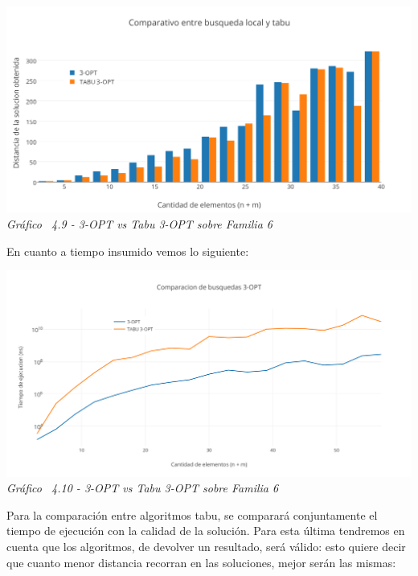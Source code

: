 \vspace*{0.3cm} \vspace*{0.3cm}
  \begin{center}
 \includegraphics[scale=0.5]{./EJ4/comparativogym03opt.png}\\
 {            \textit{Gráfico \ 4.9 - 3-OPT vs Tabu 3-OPT sobre Familia 6}}
  \end{center}
  \vspace*{0.3cm}

En cuanto a tiempo insumido vemos lo siguiente:

\vspace*{0.3cm} \vspace*{0.3cm}
  \begin{center}
 \includegraphics[scale=0.5]{./EJ4/medicion3optsinorden.png}\\
 {            \textit{Gráfico \ 4.10 - 3-OPT vs Tabu 3-OPT sobre Familia 6}}
  \end{center}
  \vspace*{0.3cm}
  
Para la comparación entre algoritmos tabu, se comparará conjuntamente el tiempo de ejecución con la calidad de la solución. Para esta última tendremos en cuenta que los algoritmos, de devolver un resultado, será válido: esto quiere decir que cuanto menor distancia recorran en las soluciones, mejor serán las mismas:

